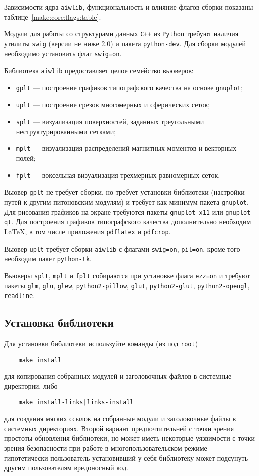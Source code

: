 Зависимости ядра \verb'aiwlib', функциональность и влияние флагов сборки показаны  таблице~\ref{make:core:flags:table}.

Модули для работы со структурами данных \verb'C++' из \verb'Python'
требуют наличия утилиты \verb'swig' (версии не ниже 2.0) и пакета
\verb'python-dev'. Для сборки модулей необходимо установить флаг \verb'swig=on'.

Библиотека \verb'aiwlib' предоставляет целое семейство вьюверов:
\begin{itemize}
  \item \verb'gplt' --- построение графиков типографского качества на
    основе {\tt gnuplot};
  \item \verb'uplt' ---  построение срезов многомерных и
    сферических сеток;
  \item\verb'splt' --- визуализация поверхностей, заданных треугольными неструктурированными сетками;
  \item\verb'mplt' --- визуализация распределений магнитных моментов
    и векторных полей;
  \item\verb'fplt' --- воксельная визуализация трехмерных равномерных
    сеток.
\end{itemize}

Вьювер \verb'gplt' не требует сборки, но требует установки библиотеки (настройки
путей к другим питоновским модулям) и требует как минимум пакета
\verb'gnuplot'.
Для рисования графиков на экране требуются пакеты \verb'gnuplot-x11'
или \verb'gnuplot-qt'. Для построения графиков типографского качества
дополнительно необходим \LaTeX, в том числе приложения \verb'pdflatex'
и \verb'pdfcrop'.

Вьювер \verb'uplt' требует сборки \verb'aiwlib' с флагами
\verb'swig=on', \verb'pil=on', кроме того необходим пакет
\verb'python-tk'.

Вьюверы \verb'splt', \verb'mplt' и \verb'fplt' собираются при
установке флага \verb'ezz=on' и требуют пакеты
\verb'glm', \verb'glu', \verb'glew', \verb'python2-pillow', \verb'glut', \verb'python2-glut', \verb'python2-opengl', \verb'readline'.


\subsection{Установка библиотеки}
Для установки библиотеки используйте команды (из под \verb'root')
\begin{verbatim}
    make install
\end{verbatim}
для копирования собранных модулей и заголовочных файлов в системные директории, либо
\begin{verbatim}
    make install-links|links-install
\end{verbatim}
для создания мягких ссылок на собранные модули и заголовочные файлы в системных директориях.
Второй вариант предпочтительней с точки зрения простоты обновления библиотеки, 
но может иметь некоторые уязвимости с точки зрения безопасности
при работе в многопользовательском режиме~--- 
гипотетически пользователь установивший у себя библиотеку может подсунуть другим пользователям вредоносный код.

